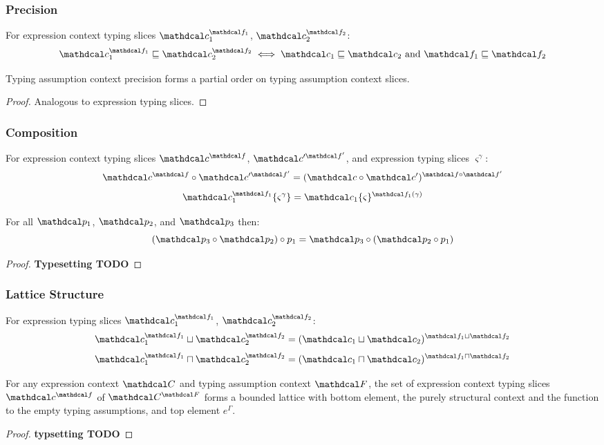 \subsubsection{Precision}
\begin{definition}
For expression context typing slices $\Cs_1^{\f_1}$, $\Cs_2^{\f_2}$:
\[\Cs_1^{\f_1} \sqsubseteq \Cs_2^{\f_2} \iff  \Cs_1 \sqsubseteq \Cs_2 \text{ and } \f_1 \sqsubseteq \f_2\]
\end{definition}\begin{proposition}
Typing assumption context precision forms a partial order on typing assumption context slices.
\end{proposition}
\begin{proof}
Analogous to expression typing slices.
\end{proof}
\subsubsection{Composition}
\begin{definition}
For expression context typing slices $\Cs^{\f}$, $\Cs'^{\f'}$, and expression typing slices $\varsigma^{\gamma}$:
\[\Cs^{\f} \circ \Cs'^{\f'} =  (\Cs \circ \Cs')^{\f \circ \f'}\]
\[\Cs_1^{\f_1}\{\varsigma^{\gamma}\} =  \Cs_1\{\varsigma\}^{\f_1(\gamma)}\]
\end{definition}\begin{proposition}
For all $\p_1$, $\p_2$, and $\p_3$ then:
\[(\p_3 \circ \p_2) \circ p_1 = \p_3 \circ (\p_2 \circ p_1)\]
\end{proposition}
\begin{proof}
\textbf{Typesetting TODO}
\end{proof}
\subsubsection{Lattice Structure}
\begin{definition}
For expression typing slices $\Cs_1^{\f_1}$, $\Cs_2^{\f_2}$:
\[\Cs_1^{\f_1} \sqcup \Cs_2^{\f_2} = (\Cs_1 \sqcup \Cs_2)^{\f_1 \sqcup \f_2}\]
\[\Cs_1^{\f_1} \sqcap \Cs_2^{\f_2} = (\Cs_1 \sqcap \Cs_2)^{\f_1 \sqcap \f_2}\]
\end{definition}

\begin{proposition}
For any expression context $\C$ and typing assumption context $\F$, the set of expression context typing slices $\Cs^{\f}$ of $\C^{\F}$ forms a bounded lattice with bottom element, the purely structural context and the function to the empty typing assumptions, and top element $e^{\Gamma}$.
\end{proposition}
\begin{proof}
\textbf{typsetting TODO}
\end{proof}

